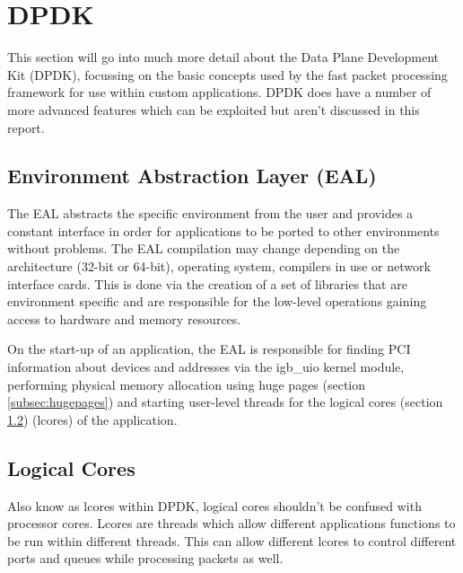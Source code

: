 \documentclass[final_report.tex]{subfiles}
\begin{document}
\section{DPDK}
\label{sec:dpdk}
This section will go into much more detail about the Data Plane Development Kit (DPDK), focussing on the basic concepts used by the fast packet processing framework for use within custom applications. DPDK does have a number of more advanced features which can be exploited but aren't discussed in this report. 

\subsection{Environment Abstraction Layer (EAL)}
The EAL abstracts the specific environment from the user and provides a constant interface in order for applications to be ported to other environments without problems. The EAL compilation may change depending on the architecture (32-bit or 64-bit), operating system, compilers in use or network interface cards. This is done via the creation of a set of libraries that are environment specific and are responsible for the low-level operations gaining access to hardware and memory resources.

On the start-up of an application, the EAL is responsible for finding PCI information about devices and addresses via the igb\_uio kernel module, performing physical memory allocation using huge pages (section \ref{subsec:hugepages}) and starting user-level threads for the logical cores (section \ref{subsec:logical_cores}) (lcores) of the application. 

\subsection{Logical Cores}
\label{subsec:logical_cores}
Also know as lcores within DPDK, logical cores shouldn't be confused with processor cores. Lcores are threads which allow different applications functions to be run within different threads. This can allow different lcores to control different ports and queues while processing packets as well.
\end{document}
